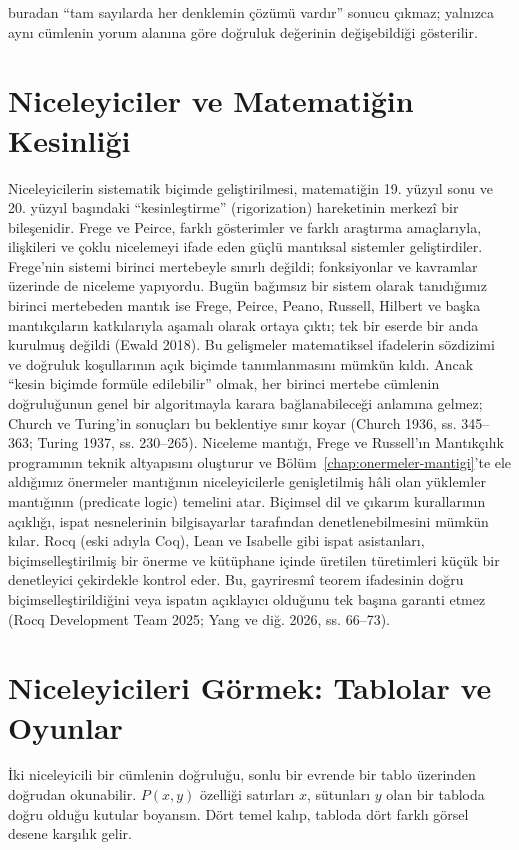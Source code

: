 buradan “tam sayılarda her denklemin çözümü vardır” sonucu çıkmaz; yalnızca aynı cümlenin yorum alanına göre doğruluk değerinin değişebildiği gösterilir.

\section{Niceleyiciler ve Matematiğin Kesinliği}

Niceleyicilerin sistematik biçimde geliştirilmesi, matematiğin 19. yüzyıl sonu ve 20. yüzyıl başındaki “kesinleştirme” (rigorization) hareketinin merkezî bir bileşenidir. Frege ve Peirce, farklı gösterimler ve farklı araştırma amaçlarıyla, ilişkileri ve çoklu nicelemeyi ifade eden güçlü mantıksal sistemler geliştirdiler. Frege’nin sistemi birinci mertebeyle sınırlı değildi; fonksiyonlar ve kavramlar üzerinde de niceleme yapıyordu. Bugün bağımsız bir sistem olarak tanıdığımız birinci mertebeden mantık ise Frege, Peirce, Peano, Russell, Hilbert ve başka mantıkçıların katkılarıyla aşamalı olarak ortaya çıktı; tek bir eserde bir anda kurulmuş değildi (Ewald 2018). Bu gelişmeler matematiksel ifadelerin sözdizimi ve doğruluk koşullarının açık biçimde tanımlanmasını mümkün kıldı. Ancak “kesin biçimde formüle edilebilir” olmak, her birinci mertebe cümlenin doğruluğunun genel bir algoritmayla karara bağlanabileceği anlamına gelmez; Church ve Turing’in sonuçları bu beklentiye sınır koyar (Church 1936, ss. 345–363; Turing 1937, ss. 230–265). Niceleme mantığı, Frege ve Russell’ın Mantıkçılık programının teknik altyapısını oluşturur ve Bölüm~\ref{chap:onermeler-mantigi}’te ele aldığımız önermeler mantığının niceleyicilerle genişletilmiş hâli olan yüklemler mantığının (predicate logic) temelini atar. Biçimsel dil ve çıkarım kurallarının açıklığı, ispat nesnelerinin bilgisayarlar tarafından denetlenebilmesini mümkün kılar. Rocq (eski adıyla Coq), Lean ve Isabelle gibi ispat asistanları, biçimselleştirilmiş bir önerme ve kütüphane içinde üretilen türetimleri küçük bir denetleyici çekirdekle kontrol eder. Bu, gayriresmî teorem ifadesinin doğru biçimselleştirildiğini veya ispatın açıklayıcı olduğunu tek başına garanti etmez (Rocq Development Team 2025; Yang ve diğ. 2026, ss. 66–73).

\section{Niceleyicileri Görmek: Tablolar ve Oyunlar}

İki niceleyicili bir cümlenin doğruluğu, sonlu bir evrende bir tablo üzerinden doğrudan okunabilir. $P(x,y)$ özelliği satırları $x$, sütunları $y$ olan bir tabloda doğru olduğu kutular boyansın. Dört temel kalıp, tabloda dört farklı görsel desene karşılık gelir.

